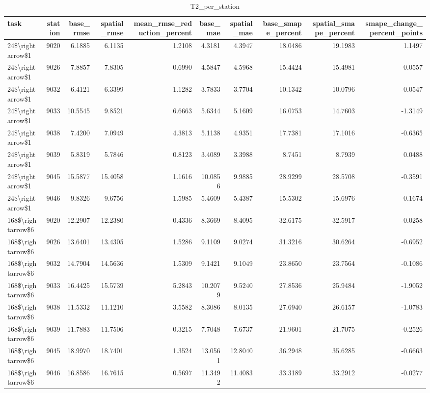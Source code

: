 \begin{table}
\caption{T2_per_station}
\label{tab:T2_per_station}
\begin{tabular}{lrrrrrrrrr}
\toprule
task & station & base\_rmse & spatial\_rmse & mean\_rmse\_reduction\_percent & base\_mae & spatial\_mae & base\_smape\_percent & spatial\_smape\_percent & smape\_change\_percent\_points \\
\midrule
24\$\textbackslash rightarrow\$1 & 9020 & 6.1885 & 6.1135 & 1.2108 & 4.3181 & 4.3947 & 18.0486 & 19.1983 & 1.1497 \\
24\$\textbackslash rightarrow\$1 & 9026 & 7.8857 & 7.8305 & 0.6990 & 4.5847 & 4.5968 & 15.4424 & 15.4981 & 0.0557 \\
24\$\textbackslash rightarrow\$1 & 9032 & 6.4121 & 6.3399 & 1.1282 & 3.7833 & 3.7704 & 10.1342 & 10.0796 & -0.0547 \\
24\$\textbackslash rightarrow\$1 & 9033 & 10.5545 & 9.8521 & 6.6663 & 5.6344 & 5.1609 & 16.0753 & 14.7603 & -1.3149 \\
24\$\textbackslash rightarrow\$1 & 9038 & 7.4200 & 7.0949 & 4.3813 & 5.1138 & 4.9351 & 17.7381 & 17.1016 & -0.6365 \\
24\$\textbackslash rightarrow\$1 & 9039 & 5.8319 & 5.7846 & 0.8123 & 3.4089 & 3.3988 & 8.7451 & 8.7939 & 0.0488 \\
24\$\textbackslash rightarrow\$1 & 9045 & 15.5877 & 15.4058 & 1.1616 & 10.0856 & 9.9885 & 28.9299 & 28.5708 & -0.3591 \\
24\$\textbackslash rightarrow\$1 & 9046 & 9.8326 & 9.6756 & 1.5985 & 5.4609 & 5.4387 & 15.5302 & 15.6976 & 0.1674 \\
168\$\textbackslash rightarrow\$6 & 9020 & 12.2907 & 12.2380 & 0.4336 & 8.3669 & 8.4095 & 32.6175 & 32.5917 & -0.0258 \\
168\$\textbackslash rightarrow\$6 & 9026 & 13.6401 & 13.4305 & 1.5286 & 9.1109 & 9.0274 & 31.3216 & 30.6264 & -0.6952 \\
168\$\textbackslash rightarrow\$6 & 9032 & 14.7904 & 14.5636 & 1.5309 & 9.1421 & 9.1049 & 23.8650 & 23.7564 & -0.1086 \\
168\$\textbackslash rightarrow\$6 & 9033 & 16.4425 & 15.5739 & 5.2843 & 10.2079 & 9.5240 & 27.8536 & 25.9484 & -1.9052 \\
168\$\textbackslash rightarrow\$6 & 9038 & 11.5332 & 11.1210 & 3.5582 & 8.3086 & 8.0135 & 27.6940 & 26.6157 & -1.0783 \\
168\$\textbackslash rightarrow\$6 & 9039 & 11.7883 & 11.7506 & 0.3215 & 7.7048 & 7.6737 & 21.9601 & 21.7075 & -0.2526 \\
168\$\textbackslash rightarrow\$6 & 9045 & 18.9970 & 18.7401 & 1.3524 & 13.0561 & 12.8040 & 36.2948 & 35.6285 & -0.6663 \\
168\$\textbackslash rightarrow\$6 & 9046 & 16.8586 & 16.7615 & 0.5697 & 11.3492 & 11.4083 & 33.3189 & 33.2912 & -0.0277 \\
\bottomrule
\end{tabular}
\end{table}
